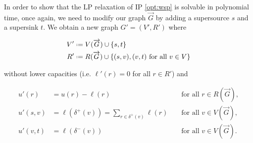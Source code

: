 In order to show that the LP relaxation of IP \eqref{opt:wsp} is solvable in polynomial time, once again, we need to modify our graph $\overrightarrow{G}$ by adding a supersource $s$ and a supersink $t$. We obtain a new graph $G' = (V', R')$ where

\begin{align*}
	V' &\defeq V(\overrightarrow{G}) \cup \{s, t\}\\
	R' &\defeq R(\overrightarrow{G}) \cup \{(s, v),(v, t) \text{ for all } v \in V\}
\end{align*}

without lower capacities (i.e. $\ell'(r) = 0$ for all $r \in R'$) and

\begin{align*}
	u'(r) &= u(r) - \ell(r) && \text{ for all } r \in R(\overrightarrow{G}),\\
	u'(s,v) &= \ell(\delta^+(v)) = \sum_{r \in \delta^+(v)} \ell(r) && \text{ for all } v \in V(\overrightarrow{G}),\\
	u'(v,t) &= \ell(\delta^-(v)) && \text{ for all } v \in V(\overrightarrow{G}).\\
\end{align*}

